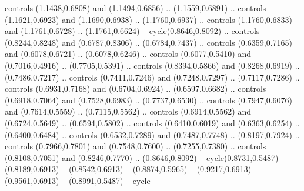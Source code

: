 {controls (1.1438,0.6808) and (1.1494,0.6856) .. (1.1559,0.6891) .. controls (1.1621,0.6923) and (1.1690,0.6938) .. (1.1760,0.6937) .. controls (1.1760,0.6833) and (1.1761,0.6728) .. (1.1761,0.6624) -- cycle(0.8646,0.8092) .. controls (0.8244,0.8248) and (0.6787,0.8306) .. (0.6784,0.7437) .. controls (0.6359,0.7165) and (0.6078,0.6721) .. (0.6078,0.6246) .. controls (0.6077,0.5410) and (0.7016,0.4916) .. (0.7705,0.5391) .. controls (0.8394,0.5866) and (0.8268,0.6919) .. (0.7486,0.7217) .. controls (0.7411,0.7246) and (0.7248,0.7297) .. (0.7117,0.7286) .. controls (0.6931,0.7168) and (0.6704,0.6924) .. (0.6597,0.6682) .. controls (0.6918,0.7064) and (0.7528,0.6983) .. (0.7737,0.6530) .. controls (0.7947,0.6076) and (0.7614,0.5559) .. (0.7115,0.5562) .. controls (0.6914,0.5562) and (0.6724,0.5649) .. (0.6594,0.5802) .. controls (0.6410,0.6019) and (0.6363,0.6254) .. (0.6400,0.6484) .. controls (0.6532,0.7289) and (0.7487,0.7748) .. (0.8197,0.7924) .. controls (0.7966,0.7801) and (0.7548,0.7600) .. (0.7255,0.7380) .. controls (0.8108,0.7051) and (0.8246,0.7770) .. (0.8646,0.8092) -- cycle(0.8731,0.5487) -- (0.8189,0.6913) -- (0.8542,0.6913) -- (0.8874,0.5965) -- (0.9217,0.6913) -- (0.9561,0.6913) -- (0.8991,0.5487) -- cycle
}

%
%

\def\picduck{%
  \qbezier(6.5,29.5)(-1,17.5)(16.8,27.3)
  \qbezier(6.5,29.5)(9,30.5)(11.4,28.0)
  \qbezier(11.4,28.0)(13.5,26.5)(16.8,27.3)
  \qbezier(06.5,29.5)(6,41.5)(16.8,42.4)
  \qbezier(16.8,42.4)(29,41)(25.3,24)
  \qbezier(7.8,23.2)(8,22.8)(8,22.5)
  \qbezier(8,22.5)(-5,9)(8,3)
  \qbezier(8,3)(22,-2)(35,6.5)
  \qbezier(35,6.5)(46,15)(35,28.3)
  \qbezier(35,28.3)(30,25)(25.3,24)
  \qbezier(13,32)(13.8,34.5)(16,34)
  \qbezier(16,34)(17.3,33.2)(16.7,31)
  \qbezier(16.7,31)(16,29.1)(14.5,29.3)
  \qbezier(14.5,29.3)(12.7,29.5)(13,32)
  \put(15.3,31.3){\circle*{1.8}}
  \qbezier(7.7,33.2)(8.4,35.7)(10.3,35)
  \qbezier(10.3,35)(11.2,34)(10.4,32.2)
  \qbezier(10.4,32.2)(9.7,30.7)(8.7,30.7)
  \qbezier(8.7,30.7)(7.2,30.9)(7.7,33.2)
  \put(9.5,32.7){\circle*{1.5}}
}

